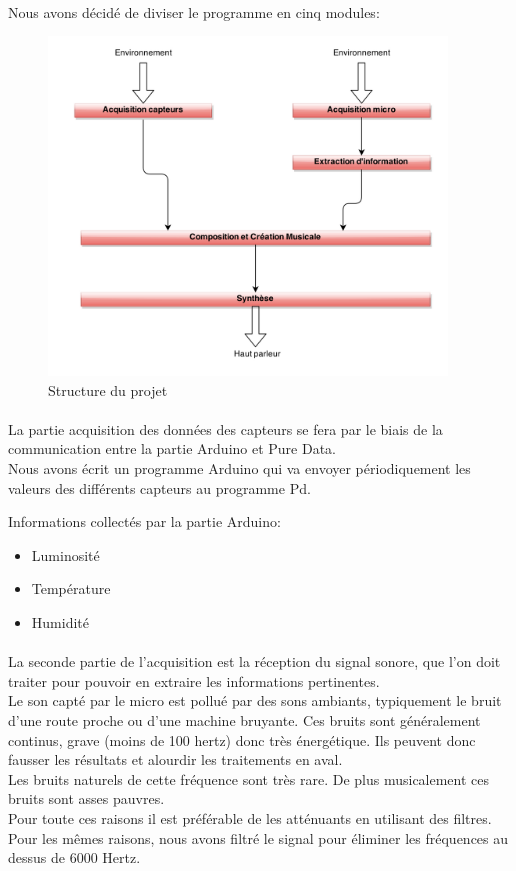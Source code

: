\documentclass[a4paper, titlepage, oneside, 12pt]{article}%
\begin{document}
\paragraph{}
Nous avons décidé de diviser le programme en cinq modules:
\begin{figure}[H]
  \centering
  \includegraphics[width=400px]{structprojet.jpg}
  \caption{Structure du projet}
\end{figure}

\paragraph{}
La partie acquisition des données des capteurs se fera par le biais de la communication entre la partie Arduino et Pure Data.\\
Nous avons écrit un programme Arduino qui va envoyer périodiquement les valeurs des différents capteurs au programme Pd.

Informations collectés par la partie Arduino:
\begin{itemize}
\item Luminosité
\item Température
\item Humidité
\end{itemize}

\paragraph{}
La seconde partie de l'acquisition est la réception du signal sonore, que l'on doit traiter pour pouvoir en extraire les informations pertinentes.\\
Le son capté par le micro est pollué par des sons ambiants, typiquement le bruit d'une route proche ou d'une machine bruyante. Ces bruits sont généralement continus, grave (moins  de 100 hertz) donc très énergétique. Ils peuvent donc fausser les résultats et alourdir les traitements en aval.\\
Les bruits naturels de cette fréquence sont très rare. De plus musicalement ces bruits sont asses pauvres.\\
Pour toute ces raisons il est préférable de les atténuants en utilisant des filtres.\\
Pour les mêmes raisons, nous avons filtré le signal pour éliminer les fréquences au dessus de 6000 Hertz.
\end{document}
